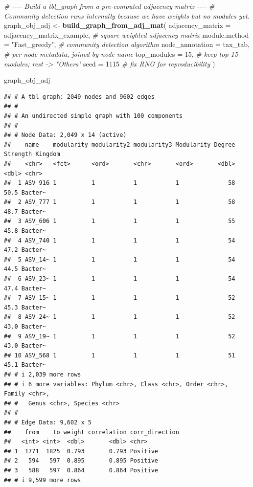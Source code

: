 \documentclass[
]{book}
\newenvironment{Shaded}{\begin{snugshade}}{\end{snugshade}}
\newcommand{\AttributeTok}[1]{\textcolor[rgb]{0.13,0.29,0.53}{#1}}
\newcommand{\CommentTok}[1]{\textcolor[rgb]{0.56,0.35,0.01}{\textit{#1}}}
\newcommand{\DecValTok}[1]{\textcolor[rgb]{0.00,0.00,0.81}{#1}}
\newcommand{\FunctionTok}[1]{\textcolor[rgb]{0.13,0.29,0.53}{\textbf{#1}}}
\newcommand{\NormalTok}[1]{#1}
\newcommand{\OtherTok}[1]{\textcolor[rgb]{0.56,0.35,0.01}{#1}}
\newcommand{\StringTok}[1]{\textcolor[rgb]{0.31,0.60,0.02}{#1}}
\begin{document}
\begin{Shaded}
\begin{Highlighting}[]
\CommentTok{\# {-}{-}{-}{-} Build a tbl\_graph from a pre{-}computed adjacency matrix {-}{-}{-}{-}}
\CommentTok{\# Community detection runs internally because we have weights but no modules yet.}
\NormalTok{graph\_obj\_adj }\OtherTok{\textless{}{-}} \FunctionTok{build\_graph\_from\_adj\_mat}\NormalTok{(}
  \AttributeTok{adjacency\_matrix =}\NormalTok{ adjacency\_matrix\_example, }\CommentTok{\# square weighted adjacency matrix}
  \AttributeTok{module.method    =} \StringTok{"Fast\_greedy"}\NormalTok{,            }\CommentTok{\# community detection algorithm}
  \AttributeTok{node\_annotation  =}\NormalTok{ tax\_tab,                  }\CommentTok{\# per{-}node metadata, joined by node name}
  \AttributeTok{top\_modules      =} \DecValTok{15}\NormalTok{,                       }\CommentTok{\# keep top{-}15 modules; rest {-}\textgreater{} "Others"}
  \AttributeTok{seed             =} \DecValTok{1115}                      \CommentTok{\# fix RNG for reproducibility}
\NormalTok{)}

\NormalTok{graph\_obj\_adj}
\end{Highlighting}
\end{Shaded}

\begin{verbatim}
## # A tbl_graph: 2049 nodes and 9602 edges
## #
## # An undirected simple graph with 100 components
## #
## # Node Data: 2,049 x 14 (active)
##    name    modularity modularity2 modularity3 Modularity Degree Strength Kingdom
##    <chr>   <fct>      <ord>       <chr>       <ord>       <dbl>    <dbl> <chr>  
##  1 ASV_916 1          1           1           1              58     50.5 Bacter~
##  2 ASV_777 1          1           1           1              58     48.7 Bacter~
##  3 ASV_606 1          1           1           1              55     45.8 Bacter~
##  4 ASV_740 1          1           1           1              54     47.2 Bacter~
##  5 ASV_14~ 1          1           1           1              54     44.5 Bacter~
##  6 ASV_23~ 1          1           1           1              54     47.4 Bacter~
##  7 ASV_15~ 1          1           1           1              52     45.3 Bacter~
##  8 ASV_24~ 1          1           1           1              52     43.0 Bacter~
##  9 ASV_19~ 1          1           1           1              52     43.0 Bacter~
## 10 ASV_568 1          1           1           1              51     45.1 Bacter~
## # i 2,039 more rows
## # i 6 more variables: Phylum <chr>, Class <chr>, Order <chr>, Family <chr>,
## #   Genus <chr>, Species <chr>
## #
## # Edge Data: 9,602 x 5
##    from    to weight correlation corr_direction
##   <int> <int>  <dbl>       <dbl> <chr>         
## 1  1771  1825  0.793       0.793 Positive      
## 2   594   597  0.895       0.895 Positive      
## 3   588   597  0.864       0.864 Positive      
## # i 9,599 more rows
\end{verbatim}
\end{document}
